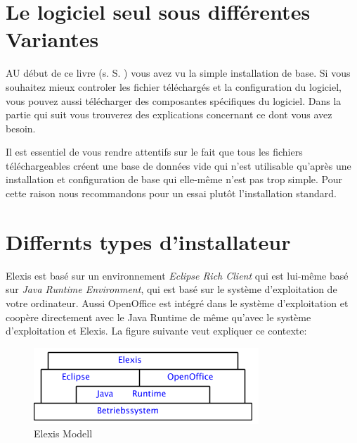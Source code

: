 %

\section{Le logiciel seul sous différentes Variantes}
\label{varianten}
AU début de ce livre (s. S. \pageref{easyinstall}) vous avez vu la simple installation de base. Si vous souhaitez mieux controler les fichier téléchargés et la configuration du logiciel, vous pouvez aussi télécharger des composantes spécifiques du logiciel. Dans la partie qui suit vous trouverez des explications concernant ce dont vous avez besoin.

Il est essentiel de vous rendre attentifs sur le fait que tous les fichiers téléchargeables créent une base de données vide qui n'est utilisable qu'après une installation et configuration de base qui elle-même n'est pas trop simple. Pour cette raison nous recommandons pour un essai plutôt l'installation standard.

\section{Differnts types d'installateur}
Elexis est basé sur un environnement \textit{Eclipse Rich Client} qui est lui-même basé sur \textit{Java Runtime Environment}, qui est basé sur le système d'exploitation de votre ordinateur. Aussi OpenOffice est intégré dans le système d'exploitation et coopère directement avec le Java Runtime de même qu'avec le système d'exploitation et Elexis. La figure suivante veut expliquer ce contexte:
\begin{figure}[hb]
\includegraphics{images/modell}
\caption{Elexis Modell}
\label{Aufbau von Elexis}
\end{figure}

